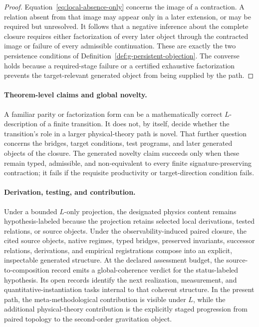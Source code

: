 \documentclass[11pt]{article}
\theoremstyle{definition}
\begin{document}
\begin{proof}
Equation~\eqref{eq:local-absence-only} concerns the image of a contraction. A
relation absent from that image may appear only in a later extension, or may be
required but unresolved. It follows that a negative inference about the complete
closure requires either factorization of every later object through the contracted
image or failure of every admissible continuation. These are exactly the two
persistence conditions of Definition~\ref{def:g-persistent-objection}. The converse
holds because a required-stage failure or a certified exhaustive factorization
prevents the target-relevant generated object from being supplied by the path.
\end{proof}

\paragraph{Theorem-level claims and global novelty.}
A familiar parity or factorization form can be a mathematically correct
$L$-description of a finite transition. It does not, by itself, decide whether the
transition's role in a larger physical-theory path is novel. That further question
concerns the bridges, target conditions, test programs, and later generated objects
of the closure. The generated novelty claim succeeds only when these remain typed,
admissible, and non-equivalent to every finite signature-preserving contraction; it
fails if the requisite productivity or target-direction condition fails.

\paragraph{Derivation, testing, and contribution.}
Under a bounded $L$-only projection, the designated physics content remains
hypothesis-labeled because the projection retains selected local derivations, tested
relations, or source objects. Under the observability-induced paired closure, the
cited source objects, native regimes, typed bridges, preserved invariants,
successor relations, derivations, and empirical registrations compose into an
explicit, inspectable generated structure. At the declared assessment budget, the
source-to-composition record emits a global-coherence verdict for the
status-labeled hypothesis. Its open records identify the next realization,
measurement, and quantitative-instantiation tasks internal to that coherent
structure. In the present path, the meta-methodological contribution is visible
under $L$, while the additional physical-theory contribution
is the explicitly staged progression from paired topology to the second-order
gravitation object.
\end{document}
